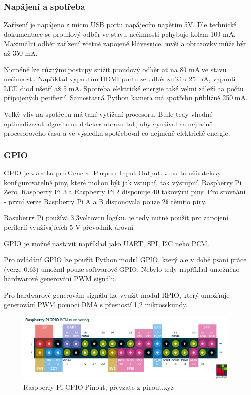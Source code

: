 \subsubsection{Napájení a spotřeba}
Zařízení je napájeno z micro USB portu napájecím napětím 5V. Dle technické dokumentace se proudový odběr ve stavu nečinnosti pohybuje kolem 100 mA. Maximální odběr zařízení včetně zapojené klávesnice, myši a obrazovky může být až 350 mA.

Nicméně lze různými postupy snížit proudový odběr až na 80 mA ve stavu nečinnosti. Například vypnutím HDMI portu se odběr sníží o 25 mA, vypnutí LED diod ušetří až 5 mA.
Spotřeba elektrické energie také velmi záleží na počtu připojených perifierií. Samostatná Python kamera má spotřebu přibližně 250 mA.

Velký vliv na spotřebu má také vytížení procesoru.
Bude tedy vhodné optimalizovat algoritmus detekce obrazu tak, aby využíval co nejméně procesorového času a ve výsledku spotřeboval co nejméně elektrické energie.

\subsubsection{GPIO}
GPIO je zkratka pro General Purpose Input Output. Jsou to uživatelsky konfigurovatelné piny, které mohou být jak vstupní, tak výstupní. Raspberry Pi Zero, Raspberry Pi 3 a Raspberry Pi 2 disponuje 40 takovými piny. Pro srovnání - první verze Raspberry Pi A a B disponovala pouze 26 těmito piny.

Raspberry Pi používá 3,3voltovou logiku, je tedy nutné použít pro zapojení periferií využívajících 5 V převodník úrovní.

GPIO je možné nastavit například jako UART, SPI, I2C nebo PCM.

Pro ovládání GPIO lze použít Python modul GPIO, který ale v době psaní práce (verze 0.63) umožnil pouze softwarové GPIO. Nebylo tedy například umožněno hardwarové generování PWM signálu.

Pro hardwarové generování signálu lze využít modul RPIO, který umožňuje generování PWM pomocí DMA s přesností 1,2 mikrosekundy.

\begin{figure}[!h]
  \begin{center}
    \includegraphics[scale=0.41]{obrazky/raspberry-pi-pinout.png}
  \end{center}
  \caption{Raspberry Pi GPIO Pinout, převzato z pinout.xyz}
\end{figure}


